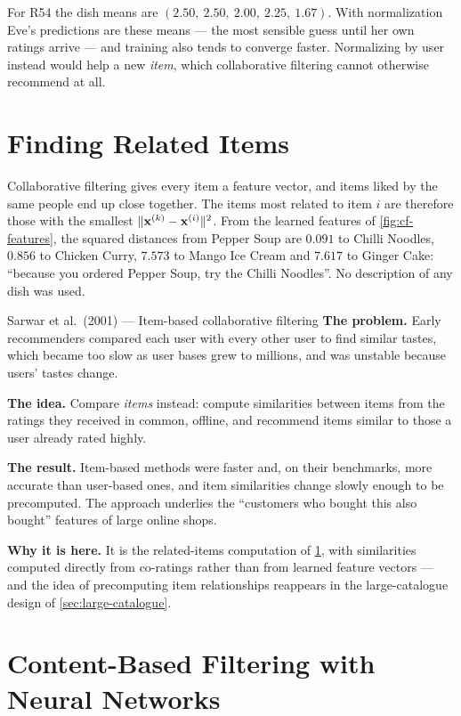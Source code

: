 For R54 the dish means are $(2.50,\ 2.50,\ 2.00,\ 2.25,\ 1.67)$. With
normalization Eve's predictions are these means --- the most sensible guess
until her own ratings arrive --- and training also tends to converge faster.
Normalizing by user instead would help a new \emph{item}, which collaborative
filtering cannot otherwise recommend at all.

\section{Finding Related Items}
\label{sec:related}

Collaborative filtering gives every item a feature vector, and items liked by the
same people end up close together. The items most related to item $i$ are
therefore those with the smallest $\|\mathbf{x}^{(k)} - \mathbf{x}^{(i)}\|^2$. From the
learned features of \cref{fig:cf-features}, the squared distances from Pepper Soup
are $0.091$ to Chilli Noodles, $0.856$ to Chicken Curry, $7.573$ to Mango Ice
Cream and $7.617$ to Ginger Cake: ``because you ordered Pepper Soup, try the
Chilli Noodles''. No description of any dish was used.

\begin{researchspotlight}{Sarwar et al.\ (2001) --- Item-based collaborative filtering}
\textbf{The problem.} Early recommenders compared each user with every other user
to find similar tastes, which became too slow as user bases grew to millions, and
was unstable because users' tastes change.

\textbf{The idea.} Compare \emph{items} instead: compute similarities between
items from the ratings they received in common, offline, and recommend items
similar to those a user already rated highly.

\textbf{The result.} Item-based methods were faster and, on their benchmarks, more
accurate than user-based ones, and item similarities change slowly enough to be
precomputed. The approach underlies the ``customers who bought this also bought''
features of large online shops.

\textbf{Why it is here.} It is the related-items computation of \cref{sec:related},
with similarities computed directly from co-ratings rather than from learned
feature vectors --- and the idea of precomputing item relationships reappears in
the large-catalogue design of \cref{sec:large-catalogue}.
\parencite{sarwar2001}
\end{researchspotlight}

\section{Content-Based Filtering with Neural Networks}
\label{sec:two-tower}

